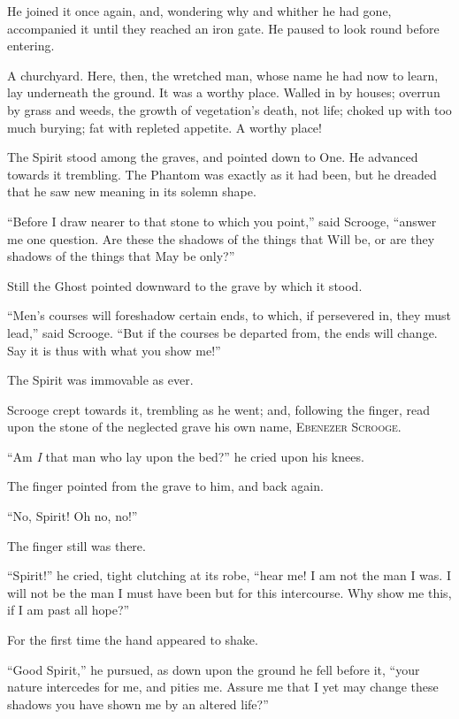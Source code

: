 \documentclass[paper=5.5in:8.5in,BCOR=7mm,twoside,DIV=calc,12pt,usegeometry]{scrbook} %
\begin{document}
He joined it once again, and, wondering why and whither he had gone, accompanied it until they reached an iron gate. He paused to look round before entering.

A churchyard. Here, then, the wretched man, whose name he had now to learn, lay underneath the ground. It was a worthy place. Walled in by houses; overrun by grass and weeds, the growth of vegetation's death, not life; choked up with too much burying; fat with repleted appetite. A worthy place!

The Spirit stood among the graves, and pointed down to One. He advanced towards it trembling. The Phantom was exactly as it had been, but he dreaded that he saw new meaning in its solemn shape.

\enquote{Before I draw nearer to that stone to which you point,} said Scrooge, \enquote{answer me one question. Are these the shadows of the things that Will be, or are they shadows of the things that May be only?}

Still the Ghost pointed downward to the grave by which it stood.

\enquote{Men's courses will foreshadow certain ends, to which, if persevered in, they must lead,} said Scrooge. \enquote{But if the courses be departed from, the ends will change. Say it is thus with what you show me!}

The Spirit was immovable as ever.

Scrooge crept towards it, trembling as he went; and, following the finger, read upon the stone of the neglected grave his own name, \textsc{Ebenezer Scrooge}.

\enquote{Am \textit{I} that man who lay upon the bed?} he cried upon his knees.

The finger pointed from the grave to him, and back again.

\enquote{No, Spirit! Oh no, no!}

The finger still was there.

\enquote{Spirit!} he cried, tight clutching at its robe, \enquote{hear me! I am not the man I was. I will not be the man I must have been but for this intercourse. Why show me this, if I am past all hope?}

For the first time the hand appeared to shake.

\enquote{Good Spirit,} he pursued, as down upon the ground he fell before it, \enquote{your nature intercedes for me, and pities me. Assure me that I yet may change these shadows you have shown me by an altered life?}
\end{document}
